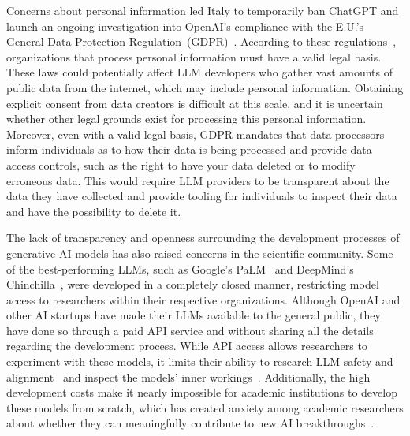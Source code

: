Concerns about personal information led Italy to temporarily ban ChatGPT and launch an ongoing investigation into OpenAI's compliance with the E.U.'s General Data Protection Regulation~(GDPR)~\citep{bbc2023chatgpt_ban}. According to these regulations~\citep{eu2018gdpr,lomas2023gdpr_llms}, organizations that process personal information must have a valid legal basis. These laws could potentially affect LLM developers who gather vast amounts of public data from the internet, which may include personal information. Obtaining explicit consent from data creators is difficult at this scale, and it is uncertain whether other legal grounds exist for processing this personal information. Moreover, even with a valid legal basis, GDPR mandates that data processors inform individuals as to how their data is being processed and provide data access controls, such as the right to have your data deleted or to modify erroneous data. This would require LLM providers to be transparent about the data they have collected and provide tooling for individuals to inspect their data and have the possibility to delete it.    

The lack of transparency and openness surrounding the development processes of generative AI models has also raised concerns in the scientific community. Some of the best-performing LLMs, such as Google's PaLM~\citep{chowdhery2022palm} and DeepMind's Chinchilla~\citep{hoffmann2022training}, were developed in a completely closed manner, restricting model access to researchers within their respective organizations. Although OpenAI and other AI startups have made their LLMs available to the general public, they have done so through a paid API service and without sharing all the details regarding the development process. While API access allows researchers to experiment with these models, it limits their ability to research LLM safety and alignment~\citep{perez2022red} and inspect the models' inner workings~\citep{olsson2022context}. Additionally, the high development costs make it nearly impossible for academic institutions to develop these models from scratch, which has created anxiety among academic researchers about whether they can meaningfully contribute to new AI breakthroughs~\citep{togelius2023choose}.

